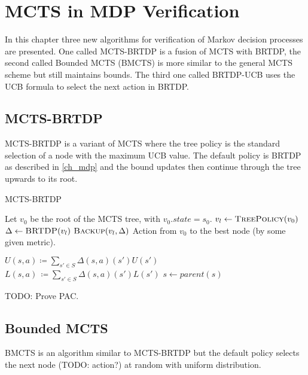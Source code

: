 \chapter{MCTS in MDP Verification}

In this chapter three new algorithms for verification of Markov
decision processes are presented. One called MCTS-BRTDP
is a fusion of MCTS with BRTDP, the second called Bounded MCTS (BMCTS) is more
similar to the general MCTS scheme but still maintains bounds. The third one called
BRTDP-UCB uses the UCB formula to select the next action in BRTDP.

\section{MCTS-BRTDP}

MCTS-BRTDP is a variant of MCTS where the tree policy is the standard
selection of a node with the maximum UCB value. The default policy is
BRTDP as described in \autoref{ch_mdp} and the bound updates then continue
through the tree upwards to its root.

\begin{algorithm}
\caption{MCTS-BRTDP}
\label{mcts-brtdp}
\begin{algorithmic}
    \State Let $v_0$ be the root of the MCTS tree, with $v_0.state = s_0$.
        \State $v_l \gets \Call{TreePolicy}{v_0}$
        \State $\Delta \gets \Call{BRTDP}{v_l}$
        \State $\Call{Backup}{v_l, \Delta}$
    \EndWhile
    \State \Return Action from $v_0$ to the best node (by some
    given metric).
\EndFunction

\Repeat
{}
\EndFunction

\Repeat
    \State $U(s,a) \coloneqq \sum_{s' \in S} \Delta(s,a)(s')U(s')$
    \State $L(s,a)\, \coloneqq \sum_{s' \in S} \Delta(s,a)(s')L(s')$
    \State $s \gets parent(s)$
\EndFunction
\end{algorithmic}
\end{algorithm}

TODO: Prove PAC.

\section{Bounded MCTS}

BMCTS is an algorithm similar to MCTS-BRTDP but the default policy
selects the next node (TODO: action?) at random with uniform
distribution.

